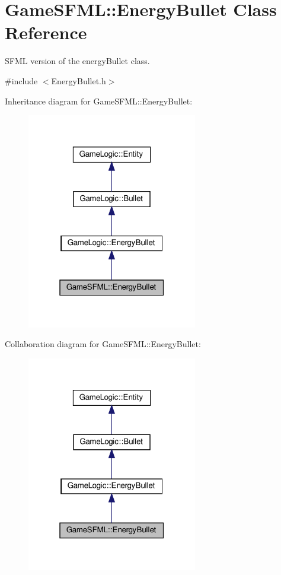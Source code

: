\hypertarget{classGameSFML_1_1EnergyBullet}{}\section{Game\+S\+F\+ML\+:\+:Energy\+Bullet Class Reference}
\label{classGameSFML_1_1EnergyBullet}


S\+F\+ML version of the energy\+Bullet class.  




{\ttfamily \#include $<$Energy\+Bullet.\+h$>$}



Inheritance diagram for Game\+S\+F\+ML\+:\+:Energy\+Bullet\+:
\nopagebreak
\begin{figure}[H]
\begin{center}
\leavevmode
\includegraphics[width=211pt]{classGameSFML_1_1EnergyBullet__inherit__graph}
\end{center}
\end{figure}


Collaboration diagram for Game\+S\+F\+ML\+:\+:Energy\+Bullet\+:
\nopagebreak
\begin{figure}[H]
\begin{center}
\leavevmode
\includegraphics[width=211pt]{classGameSFML_1_1EnergyBullet__coll__graph}
\end{center}
\end{figure}
